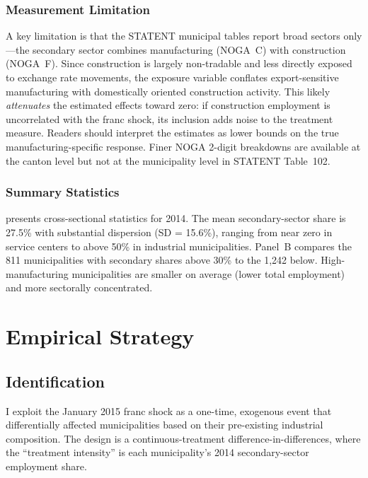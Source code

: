 \documentclass[12pt]{article}
\begin{document}
\subsubsection*{Measurement Limitation} A key limitation is that the STATENT municipal tables report broad sectors only---the secondary sector combines manufacturing (NOGA~C) with construction (NOGA~F). Since construction is largely non-tradable and less directly exposed to exchange rate movements, the exposure variable conflates export-sensitive manufacturing with domestically oriented construction activity. This likely \textit{attenuates} the estimated effects toward zero: if construction employment is uncorrelated with the franc shock, its inclusion adds noise to the treatment measure. Readers should interpret the estimates as lower bounds on the true manufacturing-specific response. Finer NOGA 2-digit breakdowns are available at the canton level but not at the municipality level in STATENT Table~102.

\subsubsection*{Summary Statistics}  presents cross-sectional statistics for 2014. The mean secondary-sector share is 27.5\% with substantial dispersion (SD = 15.6\%), ranging from near zero in service centers to above 50\% in industrial municipalities. Panel~B compares the 811 municipalities with secondary shares above 30\% to the 1,242 below. High-manufacturing municipalities are smaller on average (lower total employment) and more sectorally concentrated.




\section{Empirical Strategy}
\label{sec:strategy}

\subsection{Identification}

I exploit the January 2015 franc shock as a one-time, exogenous event that differentially affected municipalities based on their pre-existing industrial composition. The design is a continuous-treatment difference-in-differences, where the ``treatment intensity'' is each municipality's 2014 secondary-sector employment share.
\end{document}
